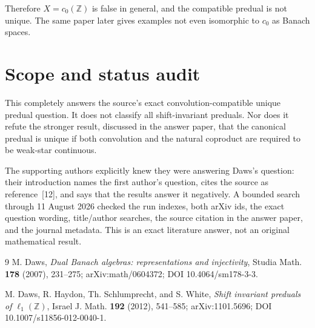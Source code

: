 \documentclass[11pt]{article}
\begin{document}
Therefore $X=c_0(\mathbb Z)$ is false in general, and the compatible predual
is not unique.  The same paper later gives examples not even isomorphic to
$c_0$ as Banach spaces.

\section{Scope and status audit}

This completely answers the source's exact convolution-compatible unique
predual question.  It does not classify all shift-invariant preduals.  Nor
does it refute the stronger result, discussed in the answer paper, that the
canonical predual is unique if both convolution and the natural coproduct
are required to be weak-star continuous.

The supporting authors explicitly knew they were answering Daws's question:
their introduction names the first author's question, cites the source as
reference~[12], and says that the results answer it negatively.  A bounded
search through 11 August 2026 checked the run indexes, both arXiv ids, the
exact question wording, title/author searches, the source citation in the
answer paper, and the journal metadata.  This is an exact literature answer,
not an original mathematical result.

\begin{thebibliography}{9}
M. Daws,
\emph{Dual Banach algebras: representations and injectivity},
Studia Math. \textbf{178} (2007), 231--275;
arXiv:math/0604372; DOI 10.4064/sm178-3-3.

M. Daws, R. Haydon, Th. Schlumprecht, and S. White,
\emph{Shift invariant preduals of $\ell_1(\mathbb Z)$},
Israel J. Math. \textbf{192} (2012), 541--585;
arXiv:1101.5696; DOI 10.1007/s11856-012-0040-1.
\end{thebibliography}
\end{document}
